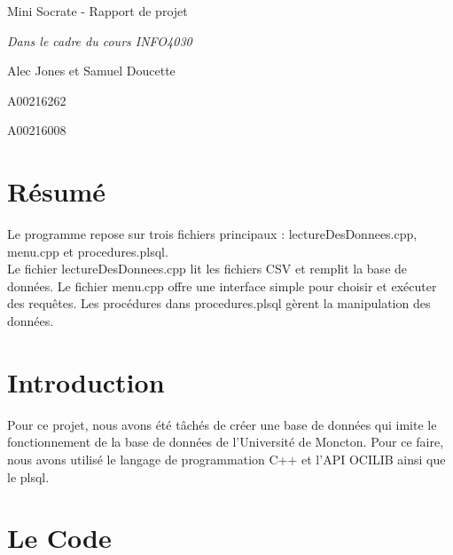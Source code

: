 \documentclass[a4paper,12pt]{article}
\begin{document}
\begin{titlepage}
    \begin{center}
        \vspace*{2cm}
        {\huge Mini Socrate - Rapport de projet\par}
        \vspace{1cm}
        {\large \textit{Dans le cadre du cours INFO4030}\par}
        \vspace{2cm}
        {\large Alec Jones et Samuel Doucette\par}
        {\large A00216262\par}
        {\large A00216008\par}
    \end{center}
\end{titlepage}

\tableofcontents
\newpage

\section{Résumé}
Le programme repose sur trois fichiers principaux : lectureDesDonnees.cpp, menu.cpp et procedures.plsql. \\
\indent Le fichier lectureDesDonnees.cpp lit les fichiers CSV et remplit la base de données.
Le fichier menu.cpp offre une interface simple pour choisir et exécuter des requêtes.
Les procédures dans procedures.plsql gèrent la manipulation des données.

\section{Introduction}
Pour ce projet, nous avons été tâchés de créer une base de données qui
imite le fonctionnement de la base de données de l'Université de Moncton.
Pour ce faire, nous avons utilisé le langage de programmation C++ et l'API OCILIB ainsi que le plsql.

\section{Le Code}
\end{document}
